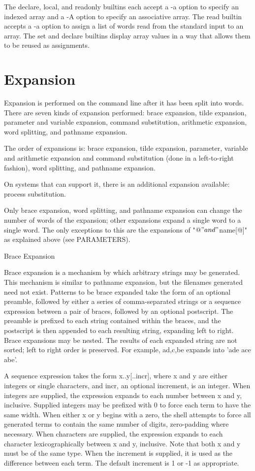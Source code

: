 \documentclass[11pt]{article}
\begin{document}
The declare, local, and readonly builtins each accept a -a option to specify an indexed array and a -A option to specify an associative array. The read builtin accepts a -a option to assign a list of words read from the standard input to an array. The set and declare builtins display array values in a way that allows them to be reused as assignments.

\section{Expansion}
\label{sec:expansion}
Expansion is performed on the command line after it has been split into words. There are seven kinds of expansion performed: brace expansion, tilde expansion, parameter and variable expansion, command substitution, arithmetic expansion, word splitting, and pathname expansion.

The order of expansions is: brace expansion, tilde expansion, parameter, variable and arithmetic expansion and command substitution (done in a left-to-right fashion), word splitting, and pathname expansion.

On systems that can support it, there is an additional expansion available: process substitution.

Only brace expansion, word splitting, and pathname expansion can change the number of words of the expansion; other expansions expand a single word to a single word. The only exceptions to this are the expansions of "$@" and "${name[@]}" as explained above (see PARAMETERS).

Brace Expansion

Brace expansion is a mechanism by which arbitrary strings may be generated. This mechanism is similar to pathname expansion, but the filenames generated need not exist. Patterns to be brace expanded take the form of an optional preamble, followed by either a series of comma-separated strings or a sequence expression between a pair of braces, followed by an optional postscript. The preamble is prefixed to each string contained within the braces, and the postscript is then appended to each resulting string, expanding left to right.
Brace expansions may be nested. The results of each expanded string are not sorted; left to right order is preserved. For example, a{d,c,b}e expands into 'ade ace abe'.

A sequence expression takes the form {x..y[..incr]}, where x and y are either integers or single characters, and incr, an optional increment, is an integer. When integers are supplied, the expression expands to each number between x and y, inclusive. Supplied integers may be prefixed with 0 to force each term to have the same width. When either x or y begins with a zero, the shell attempts to force all generated terms to contain the same number of digits, zero-padding where necessary. When characters are supplied, the expression expands to each character lexicographically between x and y, inclusive. Note that both x and y must be of the same type. When the increment is supplied, it is used as the difference between each term. The default increment is 1 or -1 as appropriate.
\end{document}
